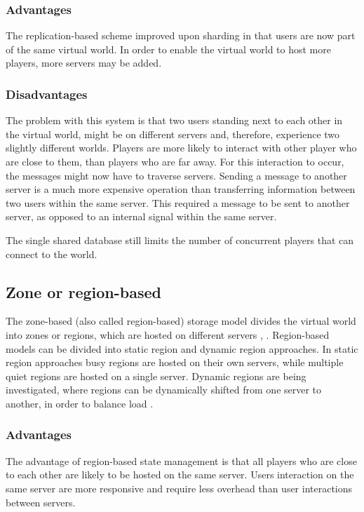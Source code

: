 \subsubsection{Advantages}

The replication-based scheme improved upon sharding in that users are now part of the same virtual world. In order to enable the virtual world to host more players, more servers may be added.

\subsubsection{Disadvantages}

The problem with this system is that two users standing next to each other in the virtual world, might be on different servers and, therefore, experience two slightly different worlds. Players are more likely to interact with other player who are close to them, than players who are far away. For this interaction to occur, the messages might now have to traverse servers. Sending a message to another server is a much more expensive operation than transferring information between two users within the same server. This required a message to be sent to another server, as opposed to an internal signal within the same server.

The single shared database still limits the number of concurrent players that can connect to the world.

\subsection{Zone or region-based}
The zone-based (also called region-based) storage model divides the virtual world into zones or regions, which are hosted on different servers \cite{zone_based_stat}, \cite{zone_based_dyn}. Region-based models can be divided into static region and dynamic region approaches. In static region approaches busy regions are hosted on their own servers, while multiple quiet regions are hosted on a single server. Dynamic regions are being investigated, where regions can be dynamically shifted from one server to another, in order to balance load \cite{zone_based_dyn}.

\subsubsection{Advantages}

The advantage of region-based state management is that all players who are close to each other are likely to be hosted on the same server. Users interaction on the same server are more responsive and require less overhead than user interactions between servers.

